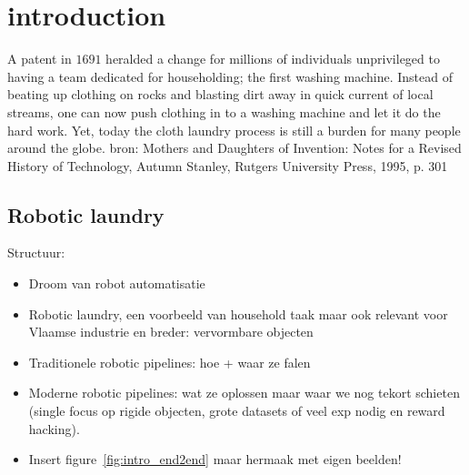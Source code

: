 \documentclass[\home/main.tex]{subfiles}
\begin{document}

\chapter{introduction}\label{ch:introduction}
A patent in $1691$ heralded a change for millions of individuals unprivileged to having a team dedicated for householding; the first washing machine. Instead of beating up clothing on rocks and blasting dirt away in quick current of local streams, one can now push clothing in to a washing machine and let it do the hard work. Yet, today the cloth laundry process is still a burden for many people around the globe. 
    bron: Mothers and Daughters of Invention: Notes for a Revised History of Technology, Autumn Stanley, Rutgers University Press, 1995, p. 301
\section{Robotic laundry}
Structuur:
\begin{itemize}
    \item Droom van robot automatisatie
    \item Robotic laundry, een voorbeeld van household taak maar ook relevant voor Vlaamse industrie en breder: vervormbare objecten
    \item Traditionele robotic pipelines: hoe + waar ze falen
    \item Moderne robotic pipelines: wat ze oplossen maar waar we nog tekort schieten (single focus op rigide objecten, grote datasets of veel exp nodig en reward hacking).
    \item Insert figure~\ref{fig:intro_end2end} maar hermaak met eigen beelden!
\end{itemize}
\end{document}
